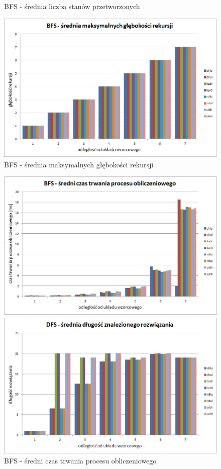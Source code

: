 \documentclass{classrep}
\begin{document}
{\begin{figure}[ht!]
\begin{center}
		\caption{BFS - średnia liczba stanów przetworzonych}
		\vspace{0.5in}
		\includegraphics[scale=0.6]{bfs4}
		\caption{BFS - średnia maksymalnych głębokości rekursji}
	\end{center}
\end{figure}
\newpage
\begin{figure}[ht!]
	\begin{center}
		\vspace{0.3in}
		\includegraphics[scale=0.6]{bfs5}
		\caption{BFS - średni czas trwania procesu obliczeniowego}
		\vspace{0.5in}
		\includegraphics[scale=0.6]{dfs1}

\end{center}
\end{figure}}
\end{document}
